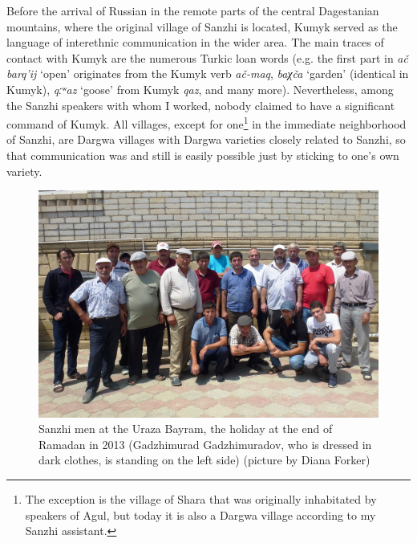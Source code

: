 Before the arrival of Russian in the remote parts of the central Dagestanian mountains, where the original village of Sanzhi is located, Kumyk served as the language of interethnic communication in the wider area. The main traces of contact with Kumyk are the numerous Turkic loan words (e.g. the first part in \textit{ač barq'ij} `open' originates from the Kumyk verb \textit{ač-maq}, \textit{baχča} `garden' (identical in Kumyk), \textit{qːʷaz} `goose' from Kumyk \textit{qaz}, and many more). Nevertheless, among the Sanzhi speakers with whom I worked, nobody claimed to have a significant command of Kumyk. All villages, except for one\footnote{The exception is the village of Shara that was originally inhabitated by speakers of Agul, but today it is also a Dargwa village according to my Sanzhi assistant.} in the immediate neighborhood of Sanzhi, are Dargwa villages with Dargwa varieties closely related to Sanzhi, so that communication was and still is easily possible just by sticking to one's own variety.

\begin{figure}
	\caption{Sanzhi men at the Uraza Bayram, the holiday at the end of Ramadan in 2013 (Gadzhimurad Gadzhimuradov, who is dressed in dark clothes, is standing on the left side) (picture by Diana Forker)}
	\label{fig:SanzhiPeople}
	\includegraphics[scale=0.4]{figures/8_uraza2013.png}
\end{figure}

